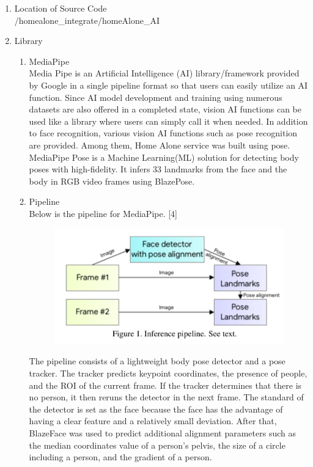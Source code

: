 \documentclass[conference]{IEEEtran}
\begin{document}
\begin{enumerate}[label=\arabic*.]
\begin{enumerate}[label=\arabic*.]
\begin{enumerate}[label=\alph*.]
\begin{enumerate}[label=\roman*.]
        \end{enumerate}
        \item{\large{Location of Source Code}}\\
        /homealone\_integrate/homeAlone\_AI\\
        \item{\large{Library}}\\
        \begin{enumerate}[label=\roman*.]
            \item{\large{MediaPipe}}\\
            Media Pipe is an Artificial Intelligence (AI) library/framework provided by Google in a single pipeline format so that users can easily utilize an AI function. Since AI model development and training using numerous datasets are also offered in a completed state, vision AI functions can be used like a library where users can simply call it when needed. In addition to face recognition, various vision AI functions such as pose recognition are provided. Among them, Home Alone service was built using pose.\\
            MediaPipe Pose is a Machine Learning(ML) solution for detecting body poses with high-fidelity. It infers 33 landmarks from the face and the body in RGB video frames using BlazePose. \\
            \item{\large{Pipeline}}\\
            Below is the pipeline for MediaPipe. [4]\\
            \begin{figure}[H]\centering \includegraphics[scale=0.4]{images/pipeline.png}\end{figure} 
            The pipeline consists of a lightweight body pose detector and a pose tracker. The tracker predicts keypoint coordinates, the presence of people, and the ROI of the current frame. If the tracker determines that there is no person, it then reruns the detector in the next frame. The standard of the detector is set as the face because the face has the advantage of having a clear feature and a relatively small deviation. After that, BlazeFace was used to predict additional alignment parameters such as the median coordinates value of a person's pelvis, the size of a circle including a person, and the gradient of a person.\\

\end{enumerate}
\end{enumerate}
\end{enumerate}
\end{enumerate}
\end{document}
